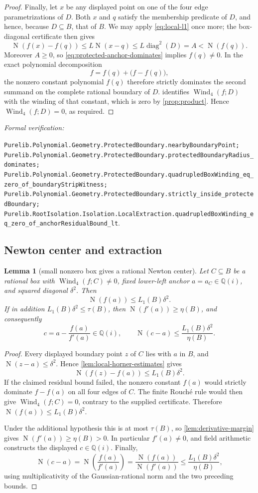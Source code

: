 \documentclass[11pt]{article}
\newtheorem{lemma}[theorem]{Lemma}
\newcommand{\Qi}{\mathbb{Q}(i)}
\newcommand{\Norm}[1]{\operatorname{N}\!\left(#1\right)}
\newcommand{\Wind}{\operatorname{Wind}}
\newcommand{\diamq}{\operatorname{diag}^{2}}
\newcommand{\leanref}[1]{\par\smallskip\noindent
  \emph{Formal verification:}\par\nobreak
  {\raggedright\nolinkurl{#1}.\par}}
\begin{document}
\begin{proof}
Finally, let $x$ be any displayed point on one of the four edge
parametrizations of $D$.  Both $x$ and $q$ satisfy the membership predicate
of $D$, and hence, because $D\subseteq B$, that of $B$.  We may apply
\eqref{eq:local-l1} once more; the box-diagonal certificate then gives
\[
 \Norm{f(x)-f(q)}\le L\Norm{x-q}\le L\diamq(D)=A<\Norm{f(q)}.
\]
Moreover $A\ge0$, so \eqref{eq:protected-anchor-dominates} implies
$f(q)\ne0$.  In the exact polynomial decomposition
\[
                    f=f(q)+\bigl(f-f(q)\bigr),
\]
the nonzero constant polynomial $f(q)$ therefore strictly dominates the
second summand on the complete rational boundary of $D$.
 identifies $\Wind_4(f;D)$ with the winding of
that constant, which is zero by \cref{prop:product}.  Hence
$\Wind_4(f;D)=0$, as required.
\end{proof}

\leanref{Purelib.Polynomial.Geometry.ProtectedBoundary.nearbyBoundaryPoint;
Purelib.Polynomial.Geometry.ProtectedBoundary.protectedBoundaryRadius_dominates;
Purelib.Polynomial.Geometry.ProtectedBoundary.quadrupledBoxWinding_eq_zero_of_boundaryStripWitness;
Purelib.Polynomial.Geometry.ProtectedBoundary.strictly_inside_protectedBoundary;
Purelib.RootIsolation.Isolation.LocalExtraction.quadrupledBoxWinding_eq_zero_of_anchorResidualBound_lt}

\subsection{Newton center and extraction}

\begin{lemma}[small nonzero box gives a rational Newton center]
\label{lem:newton-center}
Let $C\subseteq B$ be a rational box with $\Wind_4(f;C)\ne0$, fixed lower-left
anchor $a=a_C\in\Qi$, and squared diagonal $\delta^2$.  Then
\[
     \Norm{f(a)}\le L_1(B)\delta^2.
\]
If in addition $L_1(B)\delta^2\le\tau(B)$, then
$\Norm{f'(a)}\ge\eta(B)$, and consequently
\[
       c=a-\frac{f(a)}{f'(a)}\in\Qi,
       \qquad
       \Norm{c-a}\le\frac{L_1(B)\delta^2}{\eta(B)}.
\]
\end{lemma}

\begin{proof}
Every displayed boundary point $z$ of $C$ lies with $a$ in $B$, and
$\Norm{z-a}\le\delta^2$.  Hence \cref{lem:local-horner-estimates} gives
\[
       \Norm{f(z)-f(a)}\le L_1(B)\delta^2.
\]
If the claimed residual bound failed, the nonzero constant $f(a)$ would
strictly dominate $f-f(a)$ on all four edges of $C$.  The finite Rouch\'e rule
would then give $\Wind_4(f;C)=0$, contrary to the supplied certificate.
Therefore $\Norm{f(a)}\le L_1(B)\delta^2$.

Under the additional hypothesis this is at most $\tau(B)$, so
\cref{lem:derivative-margin} gives
$\Norm{f'(a)}\ge\eta(B)>0$.  In particular $f'(a)\ne0$, and field arithmetic
constructs the displayed $c\in\Qi$.  Finally,
\[
 \Norm{c-a}
 =\Norm{\frac{f(a)}{f'(a)}}
 =\frac{\Norm{f(a)}}{\Norm{f'(a)}}
 \le\frac{L_1(B)\delta^2}{\eta(B)},
\]
using multiplicativity of the Gaussian-rational norm and the two preceding
bounds.
\end{proof}
\end{document}
